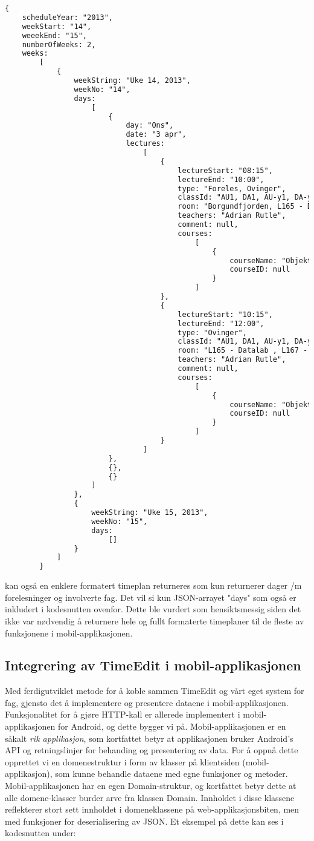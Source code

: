 \documentclass[../main.tex]{subfiles}
\begin{document}
\begin{lstlisting}[language=HTML, frame=single, caption={Forkortet JSON- av en fullt formatert timeplan som hentet fra TimeEdit og behandlet i webapplikasjonen}]
{
	scheduleYear: "2013",
	weekStart: "14",
	weeekEnd: "15",
	numberOfWeeks: 2,
	weeks: 
		[
			{
				weekString: "Uke 14, 2013",
				weekNo: "14",
				days: 
					[
						{
							day: "Ons",
							date: "3 apr",
							lectures: 
								[
									{
										lectureStart: "08:15",
										lectureEnd: "10:00",
										type: "Foreles, Ovinger",
										classId: "AU1, DA1, AU-y1, DA-y1",
										room: "Borgundfjorden, L165 - Datalab , L167 - Prosjektrom",
										teachers: "Adrian Rutle",
										comment: null,
										courses: 
											[
												{
													courseName: "Objektorientert programmering",
													courseID: null
												}
											]
									},
									{
										lectureStart: "10:15",
										lectureEnd: "12:00",
										type: "Ovinger",
										classId: "AU1, DA1, AU-y1, DA-y1",
										room: "L165 - Datalab , L167 - Prosjektrom",
										teachers: "Adrian Rutle",
										comment: null,
										courses: 
											[
												{
													courseName: "Objektorientert programmering",
													courseID: null
												}
											]
									}
								]
						},
						{},
						{}
					]
				},
				{
					weekString: "Uke 15, 2013",
					weekNo: "15",
					days: 
						[]
				}
			]
		}
\end{lstlisting}

kan også en enklere formatert timeplan returneres som kun returnerer dager /m forelesninger og involverte fag. Det vil si kun JSON-arrayet "days" som også er inkludert i kodesnutten ovenfor. Dette ble vurdert som hensiktsmessig siden det ikke var nødvendig å returnere hele og fullt formaterte timeplaner til de fleste av funksjonene i mobil-applikasjonen.

\subsection{Integrering av TimeEdit i mobil-applikasjonen}

Med ferdigutviklet metode for å koble sammen TimeEdit og vårt eget system for fag, gjensto det å implementere og presentere dataene i mobil-applikasjonen. Funksjonalitet for å gjøre HTTP-kall er allerede implementert i mobil-applikasjonen for Android, og dette bygger vi på. Mobil-applikasjonen er en såkalt \textit{rik applikasjon}, som kortfattet betyr at applikasjonen bruker Android's API og retningslinjer for behanding og presentering av data. For å oppnå dette opprettet vi en domenestruktur i form av klasser på klientsiden (mobil-applikasjon), som kunne behandle dataene med egne funksjoner og metoder. Mobil-applikasjonen har en egen Domain-struktur, og kortfattet betyr dette at alle domene-klasser burder arve fra klassen Domain. Innholdet i disse klassene reflekterer stort sett innholdet i domeneklassene på web-applikasjonsbiten, men med funksjoner for deserialisering av JSON. Et eksempel på dette kan ses i kodesnutten under:
 
\end{document}
